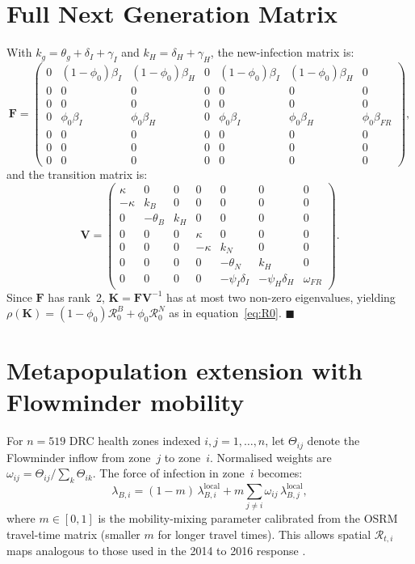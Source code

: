 \documentclass[12pt,a4paper]{article}
\begin{document}
\section{Full Next Generation Matrix}
\label{supp:B}

With $k_g = \theta_g + \delta_I + \gamma_I$ and $k_H = \delta_H + \gamma_H$,
the new-infection matrix is:
\[
\mathbf{F} =
\begin{pmatrix}
0 & (1-\phi_0)\beta_I & (1-\phi_0)\beta_H & 0 & (1-\phi_0)\beta_I & (1-\phi_0)\beta_H & 0\\
0 & 0 & 0 & 0 & 0 & 0 & 0\\
0 & 0 & 0 & 0 & 0 & 0 & 0\\
0 & \phi_0\beta_I & \phi_0\beta_H & 0 & \phi_0\beta_I & \phi_0\beta_H & \phi_0\beta_{FR}\\
0 & 0 & 0 & 0 & 0 & 0 & 0\\
0 & 0 & 0 & 0 & 0 & 0 & 0\\
0 & 0 & 0 & 0 & 0 & 0 & 0
\end{pmatrix},
\]
and the transition matrix is:
\[
\mathbf{V} =
\begin{pmatrix}
\kappa   & 0        & 0    & 0       & 0               & 0               & 0\\
-\kappa  & k_B      & 0    & 0       & 0               & 0               & 0\\
0        & -\theta_B& k_H  & 0       & 0               & 0               & 0\\
0        & 0        & 0    & \kappa  & 0               & 0               & 0\\
0        & 0        & 0    & -\kappa & k_N             & 0               & 0\\
0        & 0        & 0    & 0       & -\theta_N       & k_H             & 0\\
0        & 0        & 0    & 0       & -\psi_I\delta_I & -\psi_H\delta_H & \omega_{FR}
\end{pmatrix}.
\]
Since $\mathbf{F}$ has rank~2, $\mathbf{K}=\mathbf{F}\mathbf{V}^{-1}$ has
at most two non-zero eigenvalues, yielding
$\rho(\mathbf{K}) = (1-\phi_0)\mathcal{R}_0^B + \phi_0\mathcal{R}_0^N$
as in equation~\eqref{eq:R0}. $\blacksquare$

\section{Metapopulation extension with Flowminder mobility}
\label{supp:C}

For $n=519$ DRC health zones indexed $i,j=1,\ldots,n$, let
$\Theta_{ij}$ denote the Flowminder inflow from zone~$j$ to zone~$i$.
Normalised weights are $\omega_{ij}=\Theta_{ij}/\sum_k\Theta_{ik}$. The
force of infection in zone~$i$ becomes:
\[
  \lambda_{B,i} = (1-m)\,\lambda_{B,i}^{\text{local}}
    + m\sum_{j\neq i}\omega_{ij}\,\lambda_{B,j}^{\text{local}},
\]
where $m\in[0,1]$ is the mobility-mixing parameter calibrated from the
OSRM travel-time matrix (smaller $m$ for longer travel times). This
allows spatial $\mathcal{R}_{t,i}$ maps analogous to those used in the
2014 to 2016 response \citep{Brockmann2013}.
\end{document}

